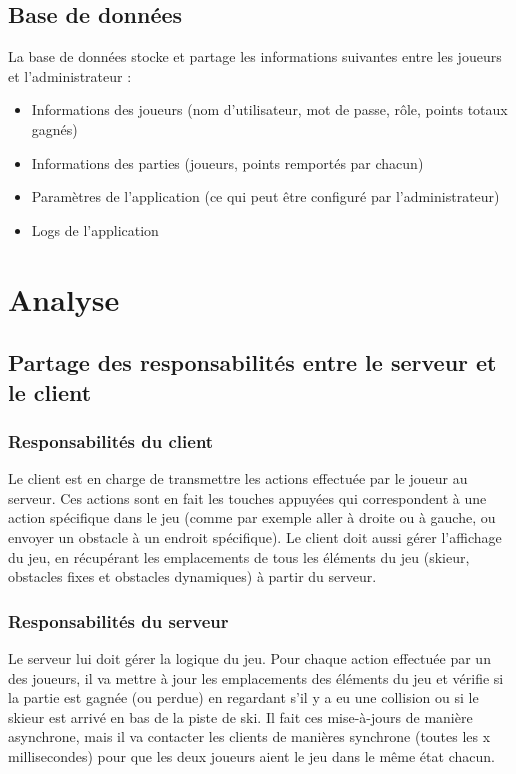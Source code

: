 \documentclass[a4paper,11pt]{article}
\begin{document}
	
	\subsection{Base de données}
	La base de données stocke et partage les informations suivantes entre les joueurs et l'administrateur :
	\begin{itemize}
		\item Informations des joueurs (nom d'utilisateur, mot de passe, rôle, points totaux gagnés)
		\item Informations des parties (joueurs, points remportés par chacun)
		\item Paramètres de l'application (ce qui peut être configuré par l'administrateur)
		\item Logs de l'application
	\end{itemize}
	
	
	\section{Analyse}
	
	
	\subsection{Partage des responsabilités entre le serveur et le client}
	
	\subsubsection{Responsabilités du client}
	Le client est en charge de transmettre les actions effectuée par le joueur au serveur. Ces actions sont en fait les touches appuyées qui correspondent à  une action spécifique dans le jeu (comme par exemple aller à droite ou à gauche, ou envoyer un obstacle à un endroit spécifique). Le client doit aussi gérer l'affichage du jeu, en récupérant les emplacements de tous les éléments du jeu (skieur, obstacles fixes et obstacles dynamiques) à partir du serveur.
	
	\subsubsection{Responsabilités du serveur}
	Le serveur lui doit gérer la logique du jeu. Pour chaque action effectuée par un des joueurs, il va mettre à jour les emplacements des éléments du jeu et vérifie si la partie est gagnée (ou perdue) en regardant s'il y a eu une collision ou si le skieur est arrivé en bas de la piste de ski. Il fait ces mise-à-jours de manière asynchrone, mais il va contacter les clients de manières synchrone (toutes les x millisecondes) pour que les deux joueurs aient le jeu dans le même état chacun.
\end{document}
